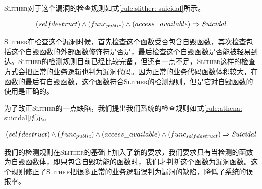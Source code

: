 \textsc{Slither}对于这个漏洞的检查规则如式\ref{rule:slither: suicidal}所示。
\begin{mdframed}[
	linewidth = 1pt,
	innertopmargin = -5pt,
	innerbottommargin = 3pt,
	outerlinewidth = 1pt
	]
    \small
	\begin{equation} \label{rule:slither: suicidal}
    \big (selfdestruct) \wedge (func_{public}) \wedge (access\_available) \Rightarrow \text{\emph{Suicidal}}
	\end{equation}
\end{mdframed}
\textsc{Slither}在检查这个漏洞时候，首先检查这个函数受否包含自毁函数，其次检查包括这个自毁函数的外部函数修饰符是否是，最后检查这个自毁函数是否能被轻易到达。\textsc{Slither}的检测规则目前已经比较完备，但还有一点不足，\textsc{Slither}这样的检查方式会把正常的业务逻辑也判为漏洞代码。因为正常的业务代码函数体积较大，在函数的最后有自毁函数，这个函数符合\textsc{Slither}的检测规则，但是它对自毁函数的使用是正确的。

为了改正\textsc{Slither}的一点缺陷，我们提出我们系统的检查规则如式\ref{rule:athena: suicidal}所示。
\begin{mdframed}[
	linewidth = 1pt,
	innertopmargin = -10pt,
	innerbottommargin = 3pt,
	outerlinewidth = 1pt
	]
    \small
	\begin{equation} \label{rule:athena: suicidal}
    \big (selfdestruct) \wedge (func_{public}) \wedge (access\_available) \wedge (func_{selfdestruct}) \Rightarrow \text{\emph{Suicidal}}
	\end{equation}
\end{mdframed}
我们的检测规则在\textsc{Slither}的基础上加入了新的要求，我们要求只有当检测的函数为自毁函数体，即只包含自毁功能的函数时，我们才判断这个函数为漏洞函数。这个规则修正了\textsc{Slither}把很多正常的业务逻辑误判为漏洞的缺陷，降低了系统的误报率。